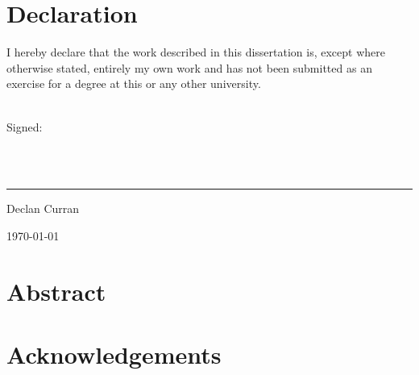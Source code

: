 \chapter*{Declaration}
I hereby declare that the work described in this dissertation is, except where otherwise stated, entirely my own work and has not been submitted as an exercise for a degree at this or any other university.

~\\
Signed:

~\\
~\\
\rule{8cm}{0.4pt}

Declan Curran

\today

\chapter*{Abstract}




\chapter*{Acknowledgements}
